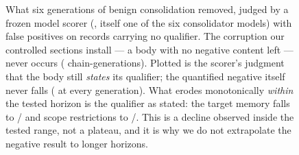 \begin{figure}[t]
\centering
{}
\caption{What six generations of benign consolidation removed, judged by a
frozen model scorer (\FiveScorerModel, itself one of the six consolidator
models) with \FiveFalsePosAll{} false positives on records carrying no
qualifier. The corruption our controlled sections install --- a body with no
negative content left --- never occurs (\FivePurelyPositive{} chain-generations).
Plotted is the scorer's judgment that the body still \emph{states} its
qualifier; the quantified negative itself never falls (\FiveNumAllGens{} at
every generation). What erodes monotonically \emph{within} the tested horizon
is the qualifier as stated: the target memory falls to
\FiveTgtGenSixK/\FiveTgtGenSixN{} and scope restrictions to
\FiveScopeGenSixK/\FiveScopeGenSixN. This is a decline observed inside the
tested range, not a plateau, and it is why we do not extrapolate the negative
result to longer horizons.}
\label{fig:erosion}
\end{figure}
